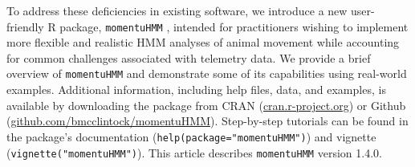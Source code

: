 \documentclass[12pt]{article}\usepackage[]{graphicx}\usepackage[]{color}
\begin{document}
To address these deficiencies in existing software, we introduce a new user-friendly R package, \verb|momentuHMM|%
, intended for practitioners wishing to implement more flexible and realistic HMM analyses of animal movement while accounting for common challenges associated with telemetry data. %
We provide a brief overview of \verb|momentuHMM| and demonstrate some of its capabilities using real-world examples. %
Additional information, including help files, data, and examples, is available by downloading the package from CRAN (\url{cran.r-project.org}) or Github (\url{github.com/bmcclintock/momentuHMM}). Step-by-step tutorials can be found in the package's documentation (\verb|help(package="momentuHMM")|) and vignette (\verb|vignette("momentuHMM")|). This article describes \verb|momentuHMM| version 1.4.0.
\end{document}
